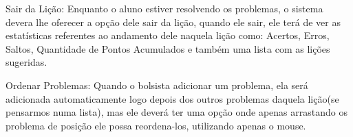 \begin{alineascomponto}
	\item Sair da Lição: Enquanto o aluno estiver resolvendo os problemas, o 
sistema devera lhe oferecer a opção dele sair da lição, quando ele sair, ele 
terá de ver as estatísticas referentes ao andamento dele naquela lição como: 
Acertos, Erros, Saltos, Quantidade de Pontos Acumulados e também uma lista com 
as lições sugeridas.
	
	\item Ordenar Problemas: Quando o bolsista adicionar um problema, ela será 
adicionada automaticamente logo depois dos outros problemas daquela lição(se 
pensarmos numa lista), mas ele deverá ter uma opção onde apenas arrastando 
os problema de posição ele possa reordena-los, utilizando apenas o mouse.

\end{alineascomponto}

